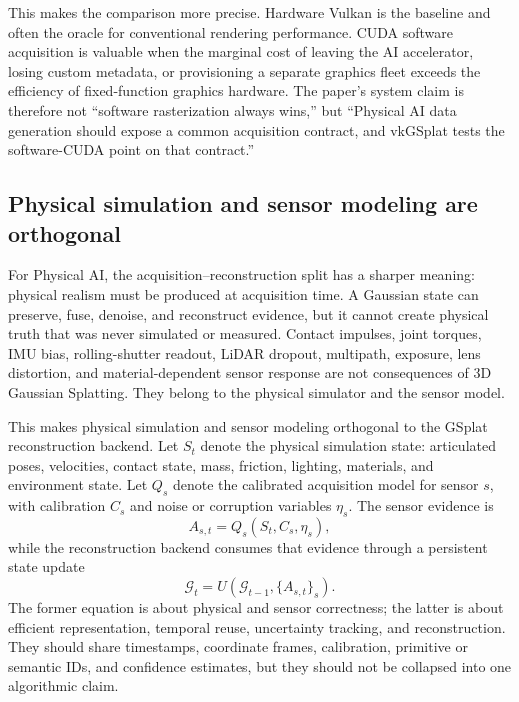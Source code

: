 \documentclass[10pt,journal,onecolumn]{IEEEtran}
\begin{document}
This makes the comparison more precise. Hardware Vulkan is the baseline and often
the oracle for conventional rendering performance. CUDA software acquisition is
valuable when the marginal cost of leaving the AI accelerator, losing custom
metadata, or provisioning a separate graphics fleet exceeds the efficiency of
fixed-function graphics hardware. The paper's system claim is therefore not
``software rasterization always wins,'' but ``Physical AI data generation should
expose a common acquisition contract, and vkGSplat tests the software-CUDA point
on that contract.''

\subsection{Physical simulation and sensor modeling are orthogonal}
\label{sec:physical-sim-sensors}

For Physical AI, the acquisition--reconstruction split has a sharper
meaning: physical realism must be produced at acquisition time. A
Gaussian state can preserve, fuse, denoise, and reconstruct evidence,
but it cannot create physical truth that was never simulated or
measured. Contact impulses, joint torques, IMU bias, rolling-shutter
readout, LiDAR dropout, multipath, exposure, lens distortion, and
material-dependent sensor response are not consequences of 3D Gaussian
Splatting. They belong to the physical simulator and the sensor model.

This makes physical simulation and sensor modeling orthogonal to the
GSplat reconstruction backend. Let $S_t$ denote the physical simulation
state: articulated poses, velocities, contact state, mass, friction,
lighting, materials, and environment state. Let $Q_s$ denote the
calibrated acquisition model for sensor $s$, with calibration $C_s$ and
noise or corruption variables $\eta_s$. The sensor evidence is
\begin{equation}
  A_{s,t} = Q_s(S_t, C_s, \eta_s),
  \label{eq:sensor-acquisition}
\end{equation}
while the reconstruction backend consumes that evidence through a
persistent state update
\begin{equation}
  \mathcal{G}_t = U(\mathcal{G}_{t-1}, \{A_{s,t}\}_s).
  \label{eq:gs-reconstruction-update}
\end{equation}
The former equation is about physical and sensor correctness; the latter
is about efficient representation, temporal reuse, uncertainty tracking,
and reconstruction. They should share timestamps, coordinate frames,
calibration, primitive or semantic IDs, and confidence estimates, but
they should not be collapsed into one algorithmic claim.
\end{document}
